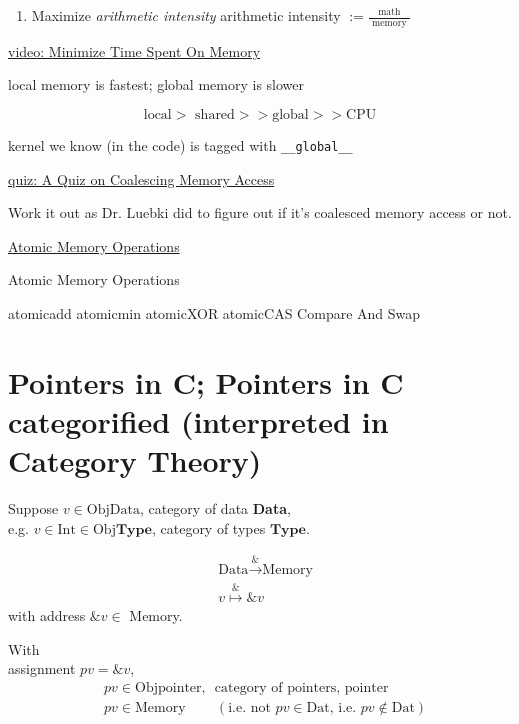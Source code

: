 \documentclass[10pt]{amsart}
\begin{document}
\begin{multicols*}{2}
\begin{enumerate}
\item Maximize \emph{arithmetic intensity}
  arithmetic intensity $:= \frac{ \text{ math } }{ \text{ memory }}$
  \end{enumerate}

\href{https://classroom.udacity.com/courses/cs344/lessons/77202674/concepts/774332070923}{video: Minimize Time Spent On Memory}

local memory is fastest; global memory is slower

\[
\text{local} > \text{ shared} >> \text{global} >> \text{CPU}
\]

kernel we know (in the code) is tagged with \verb|__global__|

\href{https://classroom.udacity.com/courses/cs344/lessons/77202674/concepts/814086830923}{quiz: A Quiz on Coalescing Memory Access}

Work it out as Dr. Luebki did to figure out if it's coalesced memory access or not.  


\href{https://classroom.udacity.com/courses/cs344/lessons/77202674/concepts/774332150923}{Atomic Memory Operations}

Atomic Memory Operations

atomicadd atomicmin atomicXOR atomicCAS Compare And Swap



\section{Pointers in C; Pointers in C categorified (interpreted in Category Theory)}

Suppose $v\in \text{ObjData}$, category of data \textbf{Data}, \\
\phantom{ Suppose} e.g. $v\in \text{Int} \in \text{Obj}\mathbf{\text{Type}}$, category of types $\mathbf{\text{Type}}$.

\[
\begin{aligned}
  & \text{Data}  \xrightarrow{ \& } \text{Memory}  \\
  & v \overset{\&}{\mapsto} \& v 
\end{aligned}
\]
with address $\& v \in $ Memory.

With \\
\phantom{With } assignment $pv = \& v$,
\[
\begin{aligned}
  & pv \in \text{Obj}\text{pointer}, \, \text{ category of pointers, pointer} \\ 
  & pv \in \text{Memory} \qquad \, (\text{i.e. not $pv \in \text{Dat}$, i.e. $pv \notin \text{Dat}$})
\end{aligned}
\]


\end{multicols*}
\end{document}
